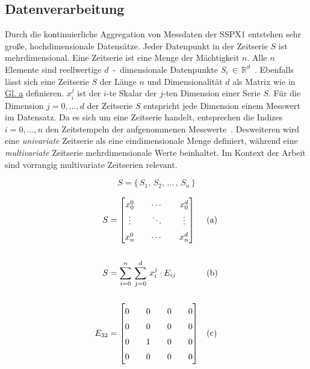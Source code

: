 \subsection{Datenverarbeitung}\label{sec:datenverarbeitung}
Durch die kontinuierliche Aggregation von Messdaten der SSPX1 entstehen sehr große, hochdimensionale Datensätze. Jeder Datenpunkt in
der Zeitserie $S$ ist mehrdimensional. Eine Zeitserie ist eine Menge der Mächtigkeit $n$. Alle $n$ Elemente sind reellwertige
$d$~-~dimensionale Datenpunkte $S_i\,\in\,\mathbb{R}^{d}$~\cite{Schmidl2022}. Ebenfalls lässt sich eine Zeitserie $S$ der Länge $n$ und
Dimensionalität $d$ als Matrix wie in \hyperref[eq:timeseries_matrix_sum]{Gl. a} definieren. $x_{i}^{j}$ ist
der $i$-te Skalar der $j$-ten Dimension einer Serie $S$. Für die Dimension $j={0,\dots,d}$ der Zeitserie $S$ entspricht jede Dimension
einem Messwert im Datensatz. Da es sich um eine Zeitserie handelt, entsprechen die Indizes $i={0, \dots, n}$ den Zeitstempeln der
aufgenommenen Messwerte~\cite{Wenig2024}. Desweiteren wird eine \textit{univariate} Zeitserie als eine eindimensionale Menge definiert,
während eine \textit{multivariate} Zeitserie mehrdimensionale Werte beinhaltet. Im Kontext der Arbeit sind vorrangig multivariate
Zeitserien relevant.

\begin{equation}
    S=\{\,S_1,\,S_2,\,\dots\,,\,S_n\,\}\label{eq:timeseries_set}
\end{equation}

\begin{equation}
    \setcounter{equation}{1}
        \begin{subequations}
        \setlength{\arraycolsep}{1em}
        \renewcommand{\arraystretch}{1.5}
        \begin{aligned}
            S &=
            \begin{bmatrix} 
                x_{0}^{0} & \cdots & x_{0}^{d} \\
                \vdots & \ddots & \vdots \\
                x_{n}^{0} & \cdots & x_{n}^{d} 
            \end{bmatrix} 
            && \text{(a)} \\[1.5em]
            S &= \sum_{i=0}^{n}\,\sum_{j=0}^{d}\,x_{i}^{j} \cdot E_{ij}
            && \text{(b)}\\[1.5em]
            E_{32} &=
            \begin{bmatrix}
                0 & 0 & 0 & 0 \\
                0 & 0 & 0 & 0 \\
                0 & 1 & 0 & 0 \\
                0 & 0 & 0 & 0 \\
            \end{bmatrix}
            && \text{(c)} \\[1.5em]
        \end{aligned}
    \end{subequations}
\label{eq:timeseries_matrix_sum}
\end{equation}

